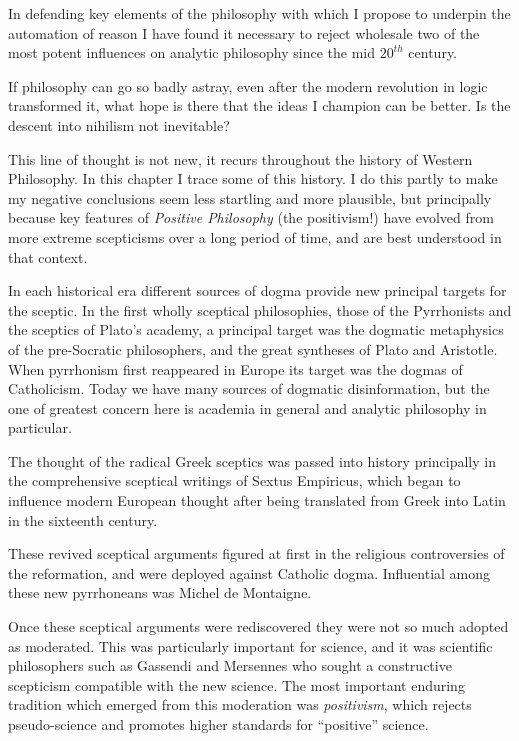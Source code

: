 In defending key elements of the philosophy with which I propose to
underpin the automation of reason I have found it necessary to reject
wholesale two of the most potent influences on analytic philosophy
since the mid $20^{th}$ century.

If philosophy can go so badly astray, even after the modern revolution
in logic transformed it, what hope is there that the ideas I champion
can be better. 
Is the descent into nihilism not inevitable?

This line of thought is not new, it recurs throughout the history of
Western Philosophy. 
In this chapter I trace some of this history.
I do this partly to make my negative conclusions seem less startling
and more plausible, but principally because key features of
\emph{Positive Philosophy} (the positivism!) have evolved from more
extreme scepticisms over a long period of time, and are best
understood in that context. 

In each historical era different sources of dogma provide new
principal targets for the sceptic.  
In the first wholly sceptical philosophies, those of the Pyrrhonists
and the sceptics of Plato's academy, a principal target was the
dogmatic metaphysics of the pre-Socratic philosophers, and the great
syntheses of Plato and Aristotle. 
When pyrrhonism first reappeared in Europe its target was the dogmas
of Catholicism. 
Today we have many sources of dogmatic disinformation, but the one of
greatest concern here is academia in general and analytic philosophy
in particular. 

The thought of the radical Greek sceptics was passed into history
principally in the comprehensive sceptical writings of Sextus
Empiricus\cite{sextusempiricusOOP}, which began to influence modern
European thought after being translated from Greek into Latin in the
sixteenth century. 

These revived sceptical arguments figured at first in the religious
controversies of the reformation, and were deployed against Catholic
dogma. 
Influential among these new pyrrhoneans was Michel de Montaigne.

Once these sceptical arguments were rediscovered they were not so much
adopted as moderated. 
This was particularly important for science, and it was scientific
philosophers such as Gassendi and Mersennes who sought a constructive
scepticism compatible with the new science.
The most important enduring tradition which emerged from this
moderation was \emph{positivism}, which rejects pseudo-science and
promotes higher standards for ``positive'' science. 

